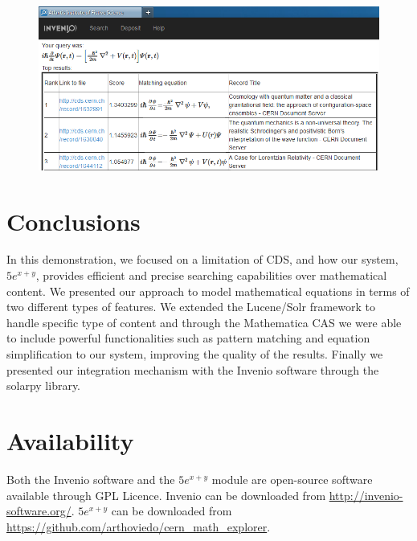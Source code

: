 \documentclass{sig-alternate}
\begin{document}
\begin{figure}
\centering
\begin{minipage}{.55\textwidth}
  \includegraphics[width=0.95\linewidth]{images/figures/results_interface_alt.png}
  \label{fig:test2}
\end{minipage}
\end{figure}

\section{Conclusions}

In this demonstration, we focused on a limitation of CDS, and how our system, $5e^{x+y}$, provides efficient and precise searching capabilities over mathematical content. We presented our approach to model mathematical equations in terms of two different types of features. We extended the Lucene/Solr framework to handle specific type of content and through the Mathematica CAS we were able to include powerful functionalities such as pattern matching and equation simplification to our system, improving the quality of the results. Finally we presented our integration mechanism with the Invenio software through the solarpy library.

\section{Availability}
Both the Invenio software and the $5e^{x+y}$ module are open-source software available through GPL Licence. Invenio can be downloaded from \url{http://invenio-software.org/}. $5e^{x+y}$ can be downloaded from \\ \url{https://github.com/arthoviedo/cern_math_explorer}. 

%

%
%
\end{document}

